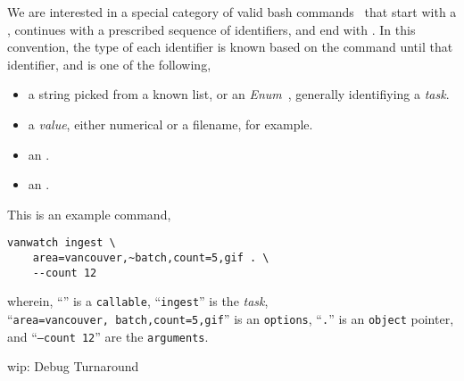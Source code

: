 We are interested in a special category of valid bash commands~\cite{shell_syntax} that start with a , continues with a prescribed sequence of identifiers, and end with \kArguments. In this convention, the type of each identifier is known based on the command until that identifier, and is one of the following,
%
\begin{itemize}
    \item a string picked from a known list, or an \emph{Enum}~\cite{python_eunum}, generally identifiying a \emph{task}.
    \item a \emph{value}, either numerical or a filename, for example.
    \item an .
    \item an .
\end{itemize}
%
This is an example command,
%
\begin{verbatim}
vanwatch ingest \
    area=vancouver,~batch,count=5,gif . \
    --count 12
\end{verbatim}
%
wherein, ``\cVanwatch'' is a \texttt{callable}, ``\texttt{ingest}'' is the \emph{task}, ``\texttt{area=vancouver,~batch,count=5,gif}'' is an \texttt{options}, ``\texttt{.}'' is an \texttt{object} pointer, and ``\texttt{--count 12}'' are the \texttt{arguments}.


wip: Debug Turnaround